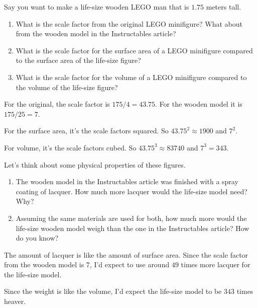 \documentclass[handout,nooutcomes,noauthor,hints]{ximera}
\begin{document}
\begin{question}
 Say you want to make a life-size wooden LEGO man that is $1.75$
 meters tall.
 
\begin{enumerate}
 \item What is the scale factor from the original LEGO minifigure?
   What about from the wooden model in the Instructables article?
 \item What is the scale factor for the surface area of a LEGO
   minifigure compared to the surface area of the life-size figure?
 \item What is the scale factor for the volume of a LEGO
   minifigure compared to the volume of the life-size figure?
\end{enumerate}
\begin{freeResponse}
\item For the original, the scale factor is $175/4 = 43.75$. For the wooden model it is $175/25 = 7$.
\item For the surface area, it's the scale factors squared. So $43.75^2\approx 1900$ and $7^2$.
\item For volume, it's the scale factors cubed. So $43.75^3\approx 83740$ and $7^3 = 343$.
\end{freeResponse}
\end{question}
\mynewpage

\begin{question}
  Let's think about some physical properties of these figures.
  \begin{enumerate}
 \item The wooden model in the Instructables article was finished with
   a spray coating of lacquer.  How much more lacquer would the life-size model need? Why?
 \item Assuming the same materials are used for both, how much more
   would the life-size wooden model weigh than the one in the
   Instructables article?  How do you know?
\end{enumerate}
  \begin{freeResponse}
  \item The amount of lacquer is like the amount of surface
    area. Since the scale factor from the wooden model is $7$, I'd
    expect to use around $49$ times more lacquer for the life-size
    model.
  \item Since the weight is like the volume, I'd expect the life-size model to be $343$ times heaver.
  \end{freeResponse}
\end{question}
\end{document}

